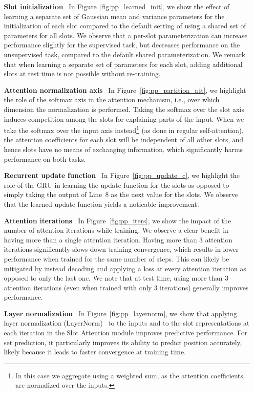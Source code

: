 \documentclass{article}
\begin{document}
\textbf{Slot initialization} \ In Figure~\ref{fig:pp_learned_init}, we show the effect of learning a separate set of Gaussian mean and variance parameters for the initialization of each slot compared to the default setting of using a shared set of parameters for all slots. We observe that a per-slot parameterization can increase performance slightly for the supervised task, but decreases performance on the unsupervised task, compared to the default shared parameterization. We remark that when learning a separate set of parameters for each slot, adding additional slots at test time is not possible without re-training.

\textbf{Attention normalization axis} \ In Figure~\ref{fig:pp_partition_att}, we highlight the role of the softmax axis in the attention mechanism, i.e., over which dimension the normalization is performed. Taking the softmax over the slot axis induces competition among the slots for explaining parts of the input. When we take the softmax over the input axis instead\footnote{In this case we aggregate using a weighted sum, as the attention coefficients are normalized over the inputs.} (as done in regular self-attention), the attention coefficients for each slot will be independent of all other slots, and hence slots have no means of exchanging information, which significantly harms performance on both tasks.

\textbf{Recurrent update function} \ In Figure~\ref{fig:pp_update_c}, we highlight the role of the GRU in learning the update function for the slots as opposed to simply taking the output of Line~8 as the next value for the slots. We observe that the learned update function yields a noticable improvement.

\textbf{Attention iterations} \ In Figure~\ref{fig:pp_iters}, we show the impact of the number of attention iterations while training. We observe a clear benefit in having more than a single attention iteration. Having more than 3 attention iterations significantly slows down training convergence, which results in lower performance when trained for the same number of steps. This can likely be mitigated by instead decoding and applying a loss at every attention iteration as opposed to only the last one. We note that at test time, using more than 3 attention iterations (even when trained with only 3 iterations) generally improves performance.

\textbf{Layer normalization} \ In Figure~\ref{fig:pp_layernorm}, we show that applying layer normalization (LayerNorm)~\citep{ba2016layer} to the inputs and to the slot representations at each iteration in the Slot Attention module improves predictive performance. For set prediction, it particularly improves its ability to predict position accurately, likely because it leads to faster convergence at training time.
\end{document}
